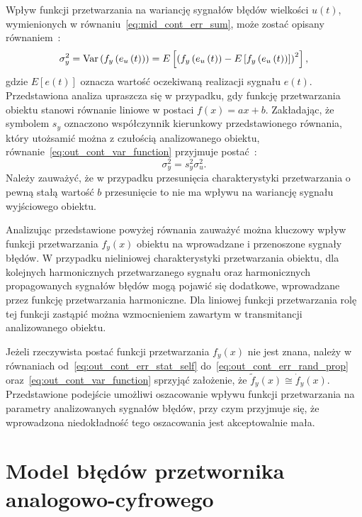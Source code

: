 Wpływ funkcji przetwarzania na wariancję sygnałów błędów wielkości $u(t)$, wymienionych w równaniu~\eqref{eq:mid_cont_err_sum}, może zostać opisany równaniem~\cite{oppenheim_sns}:
\begin{equation}
\sigma_{y}^{2} = \text{Var}\left(f_{y} \left(e_{u} \left(t\right)\right)\right) = E \left[ \left( f_{y} \left(e_{u} \left(t\right)\right) - E \left[ f_{y} \left(e_{u} \left(t\right)\right) \right] \right)^2 \right] \label{eq:out_cont_var_function},
\end{equation}
gdzie $E[e(t)]$ oznacza wartość oczekiwaną realizacji sygnału $e(t)$. Przedstawiona analiza upraszcza się w przypadku, gdy funkcję przetwarzania obiektu stanowi równanie liniowe w postaci $f(x) = ax+b$. Zakładając, że symbolem $s_{y}$ oznaczono współczynnik kierunkowy przedstawionego równania, który utożsamić można z czułością analizowanego obiektu, równanie~\eqref{eq:out_cont_var_function} przyjmuje postać~\cite{oppenheim_sns}:
\begin{equation}
\sigma_{y}^{2} = s_{y}^{2} \sigma_{u}^{2} \label{eq:out_cont_var_sense}.
\end{equation}
Należy zauważyć, że w przypadku przesunięcia charakterystyki przetwarzania o pewną stałą wartość $b$ przesunięcie to nie ma wpływu na wariancję sygnału wyjściowego obiektu.

Analizując przedstawione powyżej równania zauważyć można kluczowy wpływ funkcji przetwarzania $f_{y}(x)$ obiektu na wprowadzane i przenoszone sygnały błędów. W przypadku nieliniowej charakterystyki przetwarzania obiektu, dla kolejnych harmonicznych przetwarzanego sygnału oraz harmonicznych propagowanych sygnałów błędów mogą pojawić się dodatkowe, wprowadzane przez funkcję przetwarzania harmoniczne. Dla liniowej funkcji przetwarzania rolę tej funkcji zastąpić można wzmocnieniem zawartym w transmitancji analizowanego obiektu.

Jeżeli rzeczywista postać funkcji przetwarzania $f_{y}(x)$ nie jest znana, należy w równaniach od~\eqref{eq:out_cont_err_stat_self} do~\eqref{eq:out_cont_err_rand_prop} oraz~\eqref{eq:out_cont_var_function} sprzyjąć założenie, że $\tilde{f}_{y}(x) \cong \dot{f}_{y}(x)$. Przedstawione podejście umożliwi oszacowanie wpływu funkcji przetwarzania na parametry analizowanych sygnałów błędów, przy czym przyjmuje się, że wprowadzona niedokładność tego oszacowania jest akceptowalnie mała.

\section{Model błędów przetwornika analogowo-cyfrowego}

